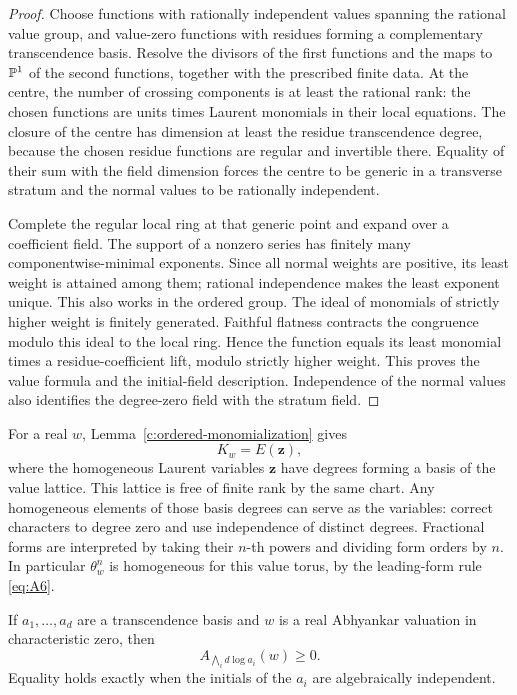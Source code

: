 \begin{proof}
Choose functions with rationally independent values spanning the
rational value group, and value-zero functions with residues forming
a complementary transcendence basis.  Resolve the divisors of the
first functions and the maps to \(\mathbb P^1\) of the second functions,
together with the prescribed finite data.  At the centre, the number
of crossing components is at least the rational rank: the chosen
functions are units times Laurent monomials in their local equations.
The closure of the centre has dimension at least the residue
transcendence degree, because the chosen residue functions are regular
and invertible there.  Equality of their sum with the field dimension
forces the centre to be generic in a transverse stratum and the normal
values to be rationally independent.

Complete the regular local ring at that generic point and expand over
a coefficient field.  The support of a nonzero series has finitely
many componentwise-minimal exponents.  Since all normal weights are
positive, its least weight is attained among them; rational
independence makes the least exponent unique.  This also works in the
ordered group.  The ideal of monomials of strictly higher weight is
finitely generated.  Faithful flatness contracts the congruence modulo
this ideal to the local ring.  Hence the function equals its least
monomial times a residue-coefficient lift, modulo strictly higher
weight.  This proves the value formula and the initial-field
description.  Independence of the normal values also identifies the
degree-zero field with the stratum field.
\end{proof}

For a real \(w\), Lemma~\ref{c:ordered-monomialization} gives
\[
                             K_w=E(\mathbf z),
\]
where the homogeneous Laurent variables \(\mathbf z\) have degrees
forming a basis of the value lattice.  This lattice is free of finite
rank by the same chart.  Any homogeneous elements of those basis
degrees can serve as the variables: correct characters to degree zero
and use independence of distinct degrees.  Fractional forms are
interpreted by taking their \(n\)-th powers and dividing form orders
by \(n\).  In particular \(\theta_w^n\) is homogeneous for this value
torus, by the leading-form rule \eqref{eq:A6}.

\begin{lemma}\label{c:log-determinant}
If \(a_1,\ldots,a_d\) are a transcendence basis and \(w\) is a real
Abhyankar valuation in characteristic zero, then
\[
                  A_{\bigwedge_i d\log a_i}(w)\ge0.
\]
Equality holds exactly when the initials of the \(a_i\) are
algebraically independent.
\end{lemma}

